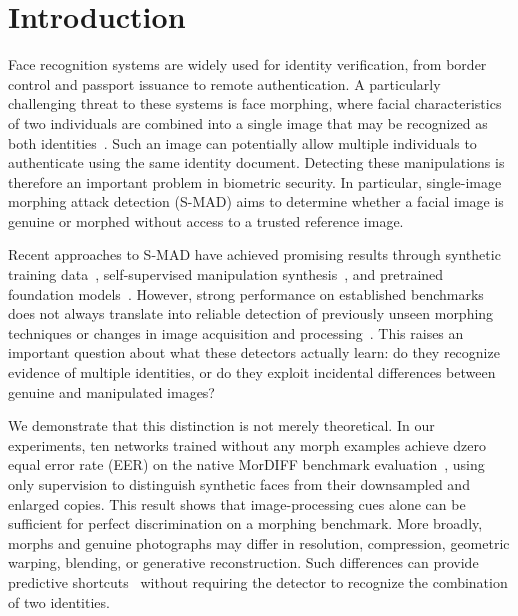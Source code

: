 \documentclass[10pt,twocolumn,letterpaper]{article}
\begin{document}
\section{Introduction}

Face recognition systems are widely used for identity verification, from border control and passport issuance to remote authentication. A particularly challenging threat to these systems is face morphing, where facial characteristics of two individuals are combined into a single image that may be recognized as both identities~\cite{ferrara2014magic,venkatesh2021survey}. Such an image can potentially allow multiple individuals to authenticate using the same identity document. Detecting these manipulations is therefore an important problem in biometric security. In particular, single-image morphing attack detection (S-MAD) aims to determine whether a facial image is genuine or morphed without access to a trusted reference image.

Recent approaches to S-MAD have achieved promising results through synthetic training data~\cite{damer2022smdd,huber2022synmad}, self-supervised manipulation synthesis~\cite{ivanovska2025selfmad,ivanovska2026selfmadpp}, and pretrained foundation models~\cite{caldeira2025madation}. However, strong performance on established benchmarks does not always translate into reliable detection of previously unseen morphing techniques or changes in image acquisition and processing~\cite{ngan2025fatemorph,paulo2026printed}. This raises an important question about what these detectors actually learn: do they recognize evidence of multiple identities, or do they exploit incidental differences between genuine and manipulated images?

We demonstrate that this distinction is not merely theoretical. In our experiments, ten networks trained without any morph examples achieve dzero equal error rate (EER) on the native MorDIFF benchmark evaluation~\cite{damer2023mordiff}, using only supervision to distinguish synthetic faces from their downsampled and enlarged copies. This result shows that image-processing cues alone can be sufficient for perfect discrimination on a morphing benchmark. More broadly, morphs and genuine photographs may differ in resolution, compression, geometric warping, blending, or generative reconstruction. Such differences can provide predictive shortcuts~\cite{geirhos2020shortcut} without requiring the detector to recognize the combination of two identities.
\end{document}
